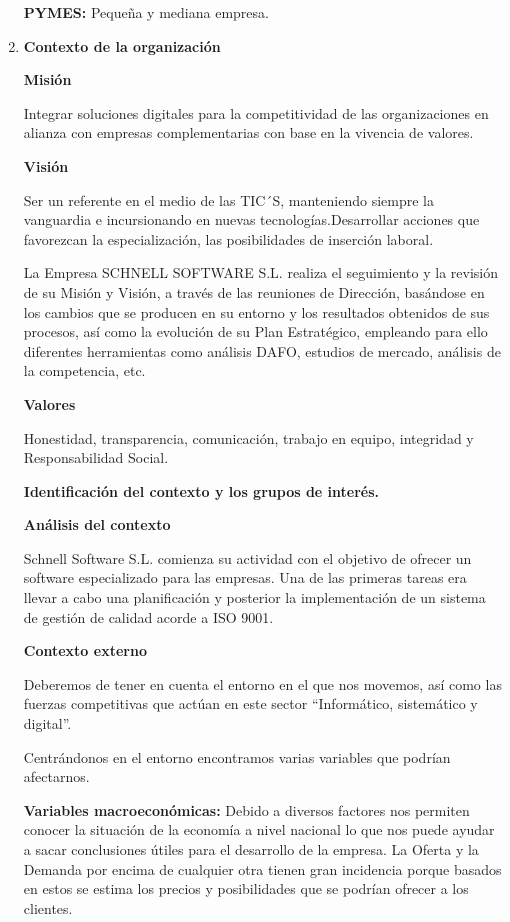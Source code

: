 \documentclass[10pt,a4paper]{article}
\begin{document}
\begin{enumerate}
\textbf{PYMES: }Pequeña y mediana empresa.

\item \textbf{Contexto de la organización}

\textbf{Misión}

Integrar soluciones digitales para la competitividad de las organizaciones en alianza con empresas complementarias con base en la vivencia de valores.

\textbf{Visión}

Ser un referente en el medio de las TIC´S, manteniendo siempre la vanguardia e incursionando en nuevas tecnologías.Desarrollar acciones que favorezcan la especialización, las posibilidades de inserción laboral.

La Empresa SCHNELL SOFTWARE S.L. realiza el seguimiento y la revisión de su Misión y Visión, a través de las reuniones de
Dirección, basándose en los cambios que se producen en su entorno y los resultados obtenidos de sus procesos, así como la evolución de su Plan Estratégico, empleando para ello diferentes herramientas como análisis DAFO, estudios de mercado, análisis de la competencia, etc.

\textbf{Valores}

Honestidad, transparencia, comunicación, trabajo en equipo, integridad y Responsabilidad Social.

\textbf{Identificación del contexto y los grupos de interés.}

\textbf{Análisis del contexto}

Schnell Software S.L. comienza su actividad con el objetivo de ofrecer un software especializado para las empresas. Una de las primeras tareas era llevar a cabo una planificación y posterior la implementación de un sistema de gestión de calidad acorde a ISO 9001.

\textbf{Contexto externo}

Deberemos de tener en cuenta el entorno en el que nos movemos, así como las fuerzas competitivas que actúan en este sector “Informático, sistemático y digital”.

Centrándonos en el entorno encontramos varias variables que podrían afectarnos.

\textbf{Variables macroeconómicas: }Debido a diversos factores nos permiten conocer la situación de la economía a nivel nacional lo que nos puede ayudar a sacar conclusiones útiles para el desarrollo de la empresa. La Oferta y la Demanda por encima de cualquier otra tienen gran incidencia porque basados en estos se estima los precios y posibilidades que se podrían ofrecer a los clientes.


\end{enumerate}
\end{document}
